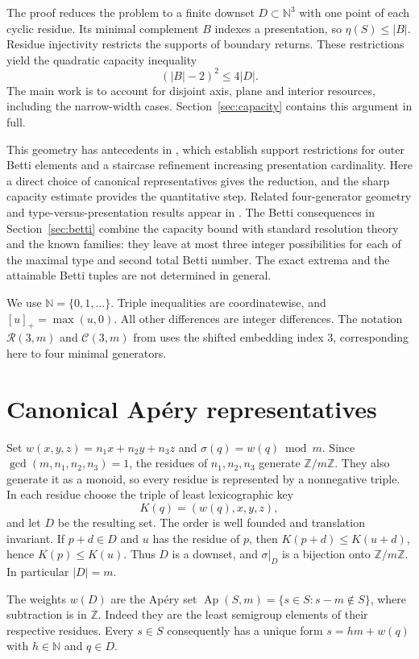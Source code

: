 \documentclass[11pt]{article}
\DeclareMathOperator{\Ap}{Ap}
\begin{document}
The proof reduces the problem to a finite downset $D\subset\mathbb N^3$
with one point of each cyclic residue. Its minimal complement $B$ indexes
a presentation, so $\eta(S)\le|B|$. Residue injectivity restricts the
supports of boundary returns. These restrictions yield the quadratic
capacity inequality
\[
 (|B|-2)^2\le4|D|.
\]
The main work is to account for disjoint axis, plane and interior
resources, including the narrow-width cases. Section~\ref{sec:capacity}
contains this argument in full.

This geometry has antecedents in
\cite[Proposition~5.2 and Theorem~6.2]{BMO25}, which establish support
restrictions for outer Betti elements and a staircase refinement
increasing presentation cardinality. Here a direct choice of canonical
representatives gives the reduction, and the sharp capacity estimate
provides the quantitative step. Related four-generator geometry and
type-versus-presentation results appear in \cite{Chomicz26A,Chomicz26B}.
The Betti consequences in Section~\ref{sec:betti} combine the capacity
bound with standard resolution theory and the known families: they leave
at most three integer possibilities for each of the maximal type and
second total Betti number. The exact extrema and the attainable Betti
tuples are not determined in general.

We use $\mathbb N=\{0,1,\ldots\}$. Triple inequalities are coordinatewise,
and $[u]_+=\max(u,0)$. All other differences are integer differences.
The notation $\mathcal R(3,m)$ and $\mathcal C(3,m)$ from \cite{MS25}
uses the shifted embedding index $3$, corresponding here to four
minimal generators.

\section{Canonical Ap\'ery representatives}
\label{sec:canonical}
Set $w(x,y,z)=n_1x+n_2y+n_3z$ and
$\sigma(q)=w(q)\bmod m$. Since $\gcd(m,n_1,n_2,n_3)=1$, the residues
of $n_1,n_2,n_3$ generate $\mathbb Z/m\mathbb Z$. They also generate it
as a monoid, so every residue is represented by a nonnegative triple.
In each residue choose the triple of least lexicographic key
\[
K(q)=(w(q),x,y,z),
\]
and let $D$ be the resulting set. The order is well founded and
translation invariant. If $p+d\in D$ and $u$ has the residue of $p$,
then $K(p+d)\le K(u+d)$, hence $K(p)\le K(u)$. Thus $D$ is a
downset, and $\sigma|_D$ is a bijection onto $\mathbb Z/m\mathbb Z$.
In particular $|D|=m$.

The weights $w(D)$ are the Ap\'ery set
$\Ap(S,m)=\{s\in S:s-m\notin S\}$, where subtraction is in
$\mathbb Z$. Indeed they are the least semigroup elements of their
respective residues. Every $s\in S$ consequently has a unique form
$s=hm+w(q)$ with $h\in\mathbb N$ and $q\in D$.
\end{document}
